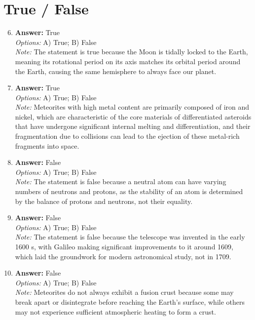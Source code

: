 \documentclass[12pt]{article}
\begin{document}
\section*{True / False}
\begin{enumerate}[label=\arabic*.]
\setcounter{enumi}{5}
\item \textbf{Answer:} True
\\ \textit{Options:} A) True; B) False
\\ \textit{Note:} The statement is true because the Moon is tidally locked to the Earth, meaning its rotational period on its axis matches its orbital period around the Earth, causing the same hemisphere to always face our planet.
\item \textbf{Answer:} True
\\ \textit{Options:} A) True; B) False
\\ \textit{Note:} Meteorites with high metal content are primarily composed of iron and nickel, which are characteristic of the core materials of differentiated asteroids that have undergone significant internal melting and differentiation, and their fragmentation due to collisions can lead to the ejection of these metal-rich fragments into space.
\item \textbf{Answer:} False
\\ \textit{Options:} A) True; B) False
\\ \textit{Note:} The statement is false because a neutral atom can have varying numbers of neutrons and protons, as the stability of an atom is determined by the balance of protons and neutrons, not their equality.
\item \textbf{Answer:} False
\\ \textit{Options:} A) True; B) False
\\ \textit{Note:} The statement is false because the telescope was invented in the early 1600 s, with Galileo making significant improvements to it around 1609, which laid the groundwork for modern astronomical study, not in 1709.
\item \textbf{Answer:} False
\\ \textit{Options:} A) True; B) False
\\ \textit{Note:} Meteorites do not always exhibit a fusion crust because some may break apart or disintegrate before reaching the Earth's surface, while others may not experience sufficient atmospheric heating to form a crust.
\end{enumerate}
\end{document}

